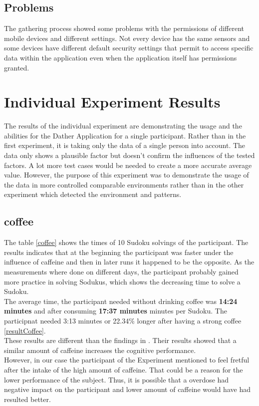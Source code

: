 \FloatBarrier

\subsection{Problems}
The gathering process showed some problems with the permissions of different mobile devices and different settings. Not every device has the same sensors and some devices have different default security settings that permit to access specific data within the application even when the application itself has permissions granted.

\section{Individual Experiment Results}
The results of the individual experiment are demonstrating the usage and the abilities for the Dather Application for a single participant. Rather than in the first experiment, it is taking only the data of a single person into account.
The data only shows a plausible factor but doesn't confirm the influences of the tested factors. A lot more test cases would be needed to create a more accurate average value. However, the purpose of this experiment was to demonstrate the usage of the data in more controlled comparable environments rather than in the other experiment which detected the environment and patterns. 

\subsection{coffee}
The table \ref{coffee} shows the times of 10 Sudoku solvings of the participant. The results indicates that at the beginning the participant was faster under the influence of caffeine and then in later runs it happened to be the opposite. As the measurements where done on different days, the participant probably gained more practice in solving Sodukus, which shows the decreasing time to solve a Sudoku.
\\
The average time, the participant needed without drinking coffee was \textbf{14:24 minutes} and after consuming \textbf{17:37 minutes} minutes per Sudoku. The participnat needed 3:13 minutes or 22.34\%  longer after having a strong coffee \ref{resultCoffee}.\\
These results are different than the findings in \cite{liguori1997absorption}. Their results showed that a similar amount of caffeine increases the cognitive performance. \\
However, in our case the participant of the Experiment mentioned to feel fretful after the intake of the high amount of caffeine. That could be a reason for the lower performance of the subject. Thus, it is possible that a overdose had negative impact on the participant and lower amount of caffeine would have had resulted better. 

